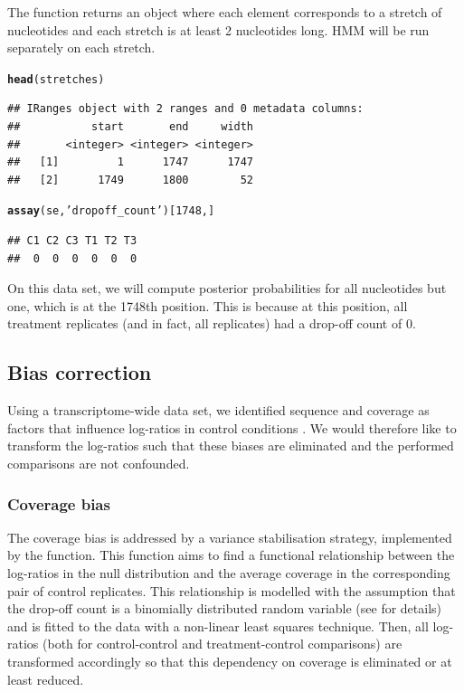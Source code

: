 \documentclass{article}\usepackage[]{graphicx}\usepackage[usenames,dvipsnames]{color}
\makeatletter
\newcommand{\hlnum}[1]{\textcolor[rgb]{0.686,0.059,0.569}{#1}}%
\newcommand{\hlstr}[1]{\textcolor[rgb]{0.192,0.494,0.8}{#1}}%
\newcommand{\hlstd}[1]{\textcolor[rgb]{0.345,0.345,0.345}{#1}}%
\newcommand{\hlkwd}[1]{\textcolor[rgb]{0.737,0.353,0.396}{\textbf{#1}}}%
\newenvironment{kframe}{%
 \def\at@end@of@kframe{}%
 \ifinner\ifhmode%
  \def\at@end@of@kframe{\end{minipage}}%
  \begin{minipage}{\columnwidth}%
 \fi\fi%
 \def\FrameCommand##1{\hskip\@totalleftmargin \hskip-\fboxsep
 \colorbox{shadecolor}{##1}\hskip-\fboxsep
     \hskip-\linewidth \hskip-\@totalleftmargin \hskip\columnwidth}%
 \MakeFramed {\advance\hsize-\width
   \@totalleftmargin\z@ \linewidth\hsize
   \@setminipage}}%
 {\par\unskip\endMakeFramed%
 \at@end@of@kframe}
\newenvironment{knitrout}{}{} %
\makeatother
\begin{document}
The function returns an  object where each element corresponds
to a stretch of nucleotides and each stretch is at least 2 nucleotides long.
HMM will be run separately on each stretch.

\begin{knitrout}
\color{fgcolor}\begin{kframe}
\begin{alltt}
\hlkwd{head}\hlstd{(stretches)}
\end{alltt}
\begin{verbatim}
## IRanges object with 2 ranges and 0 metadata columns:
##           start       end     width
##       <integer> <integer> <integer>
##   [1]         1      1747      1747
##   [2]      1749      1800        52
\end{verbatim}
\begin{alltt}
\hlkwd{assay}\hlstd{(se,} \hlstr{'dropoff_count'}\hlstd{)[}\hlnum{1748}\hlstd{,]}
\end{alltt}
\begin{verbatim}
## C1 C2 C3 T1 T2 T3 
##  0  0  0  0  0  0
\end{verbatim}
\end{kframe}
\end{knitrout}

On this data set, we will compute posterior probabilities for all nucleotides
but one, which is at the 1748th position. This is because at this position, all
treatment replicates (and in fact, all replicates) had a drop-off count of 0.

\subsection{Bias correction}

Using a transcriptome-wide data set, we identified sequence and coverage as
factors that influence log-ratios in control conditions \cite{selega2016robust}.
We would therefore like to transform the log-ratios such that these biases are
eliminated and the performed comparisons are not confounded.

\subsubsection{Coverage bias}

The coverage bias is addressed by a variance stabilisation strategy, implemented
by the  function. This function aims to find a
functional relationship between the log-ratios in the null distribution and the
average coverage in the corresponding pair of control replicates. This
relationship is modelled with the assumption that the drop-off count is a
binomially distributed random variable (see \cite{selega2016robust} for details)
and is fitted to the data with a non-linear least squares technique. Then, all
log-ratios (both for control-control and treatment-control comparisons) are
transformed accordingly so that this dependency on coverage is eliminated or at
least reduced.
\end{document}
